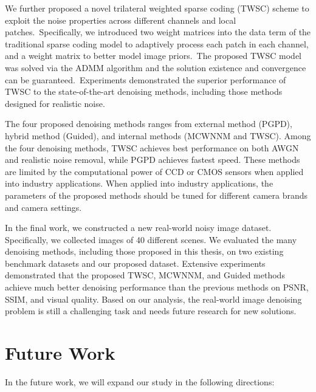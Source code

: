 We further proposed a novel trilateral weighted sparse coding (TWSC) scheme to exploit the noise properties across different channels and local patches.\ Specifically, we introduced two weight matrices into the data term of the traditional sparse coding model to adaptively process each patch in each channel, and a weight matrix to better model image priors.\ The proposed TWSC model was solved via the ADMM algorithm and the solution existence and convergence can be guaranteed.\ Experiments demonstrated the superior performance of TWSC to the state-of-the-art denoising methods, including those methods designed for realistic noise.

The four proposed denoising methods ranges from external method (PGPD), hybrid method (Guided), and internal methods (MCWNNM and TWSC). Among the four denoising methods, TWSC achieves best performance on both AWGN and realistic noise removal, while PGPD achieves fastest speed. These methods are limited by the computational power of CCD or CMOS sensors when applied into industry applications. When applied into industry applications, the parameters of the proposed methods should be tuned for different camera brands and camera settings.

In the final work, we constructed a new real-world noisy image dataset. Specifically, we collected images of 40 different scenes. We evaluated the many denoising methods, including those proposed in this thesis, on two existing benchmark datasets and our proposed dataset. Extensive experiments demonstrated that the proposed TWSC, MCWNNM, and Guided methods achieve much better denoising performance than the previous methods on PSNR, SSIM, and visual quality. Based on our analysis, the real-world image denoising problem is still a challenging task and needs future research for new solutions.

\section{Future Work}
\label{sec:conclusions:future}

In the future work, we will expand our study in the following directions:

